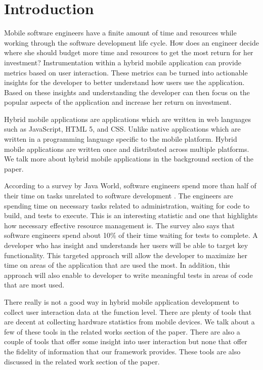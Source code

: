 \section{Introduction}
Mobile software engineers have a finite amount of time and resources while working through the software development life cycle. How does an engineer decide where she should budget more time and resources to get the most return for her investment? Instrumentation within a hybrid mobile application can provide metrics based on user interaction. These metrics can be turned into actionable insights for the developer to better understand how users use the application. Based on these insights and understanding the developer can then focus on the popular aspects of the application and increase her return on investment. 

Hybrid mobile applications are applications which are written in web languages such as JavaScript, HTML 5, and CSS.  Unlike native applications which are written in a programming language specific to the mobile platform. Hybrid mobile applications are written once and distributed across multiple platforms. We talk more about hybrid mobile applications in the background section of the paper.

According to a survey by Java World, software engineers spend more than half of their time on tasks unrelated to software development \cite{JavaWorld}. The engineers are spending time on necessary tasks related to administration, waiting for code to build, and tests to execute. This is an interesting statistic and one that highlights how necessary effective resource management is. The survey also says that software engineers spend about 10\% of their time waiting for tests to complete. A developer who has insight and understands her users will be able to target key functionality. This targeted approach will allow the developer to maximize her time on areas of the application that are used the most. In addition, this approach will also enable to developer to write meaningful tests in areas of code that are most used. 

There really is not a good way in hybrid mobile application development to collect user interaction data at the function level. There are plenty of tools that are decent at collecting hardware statistics from mobile devices. We talk about a few of these tools in the related works section of the paper. There are also a couple of tools that offer some insight into user interaction but none that offer the fidelity of information that our framework provides. These tools are also discussed in the related work section of the paper.

